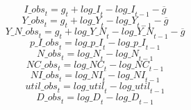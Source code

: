 \begin{dmath}
{I\_obs}_{t}={{g}}_{t}+{log\_I}_{t}-{log\_I}_{t-1}-{{\overline{g}}}
\end{dmath}
\begin{dmath}
{Y\_obs}_{t}={{g}}_{t}+{log\_Y}_{t}-{log\_Y}_{t-1}-{{\overline{g}}}
\end{dmath}
\begin{dmath}
{Y\_N\_obs}_{t}={{g}}_{t}+{log\_Y\_N}_{t}-{log\_Y\_N}_{t-1}-{{\overline{g}}}
\end{dmath}
\begin{dmath}
{p\_I\_obs}_{t}={log\_p\_I}_{t}-{log\_p\_I}_{t-1}
\end{dmath}
\begin{dmath}
{N\_obs}_{t}={log\_N}_{t}-{log\_N}_{t-1}
\end{dmath}
\begin{dmath}
{NC\_obs}_{t}={log\_NC}_{t}-{log\_NC}_{t-1}
\end{dmath}
\begin{dmath}
{NI\_obs}_{t}={log\_NI}_{t}-{log\_NI}_{t-1}
\end{dmath}
\begin{dmath}
{util\_obs}_{t}={log\_util}_{t}-{log\_util}_{t-1}
\end{dmath}
\begin{dmath}
{D\_obs}_{t}={log\_D}_{t}-{log\_D}_{t-1}
\end{dmath}
